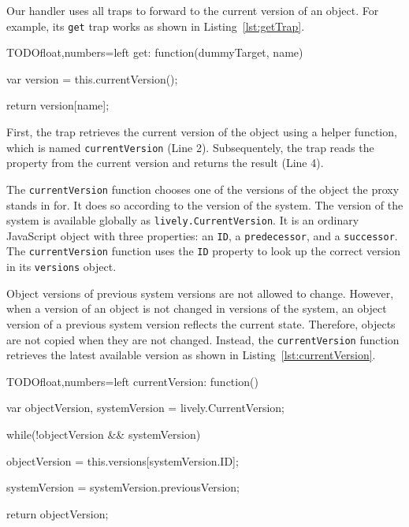 Our handler uses all traps to forward to the current version of an object.
For example, its \lstinline{get} trap works as shown in Listing~\ref{lst:getTrap}.

\begin{code}{TODO}{float,numbers=left}
get: function(dummyTarget, name) {
    var version = this.currentVersion();
    
    return version[name];
}
\end{code}
\label{lst:getTrap}
\iffalse
\end{verbatim}\fi

First, the trap retrieves the current version of the object using a helper function, which is named \lstinline{currentVersion} (Line 2).
Subsequentely, the trap reads the property from the current version and returns the result (Line 4).

The \lstinline{currentVersion} function chooses one of the versions of the object the proxy stands in for.
It does so according to the version of the system.
The version of the system is available globally as \lstinline{lively.CurrentVersion}.
It is an ordinary JavaScript object with three properties: an \lstinline{ID}, a \lstinline{predecessor}, and a \lstinline{successor}.
The \lstinline{currentVersion} function uses the \lstinline{ID} property to look up the correct version in its \lstinline{versions} object.

Object versions of previous system versions are not allowed to change.
However, when a version of an object is not changed in versions of the system, an object version of a previous system version reflects the current state.
Therefore, objects are not copied when they are not changed.
Instead, the \lstinline{currentVersion} function retrieves the latest available version as shown in Listing~\ref{lst:currentVersion}.

\begin{code}{TODO}{float,numbers=left}
currentVersion: function() {
    var objectVersion,
        systemVersion = lively.CurrentVersion;
    
    while(!objectVersion && systemVersion) {
        objectVersion = this.versions[systemVersion.ID];

        systemVersion = systemVersion.previousVersion;
    }
    
    return objectVersion;
}
\end{code}
\label{lst:currentVersion}
\iffalse
\end{verbatim}\fi

